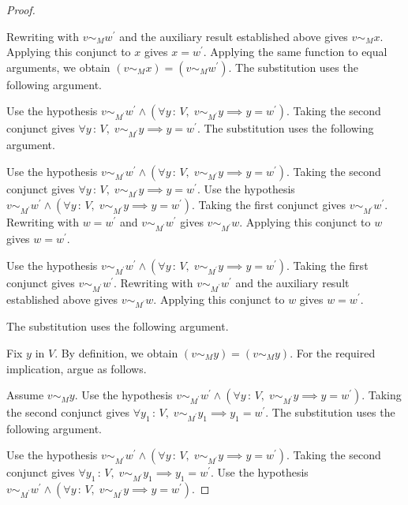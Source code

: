\documentclass{article}
\theoremstyle{paperresult}
\newenvironment{proofstep}{\par\smallskip\ifdim\leftskip<3em\relax\advance\leftskip by 1em\relax\fi\noindent\ignorespaces}{\par\smallskip}
\begin{document}
\begin{proof}
\begin{proofstep}
\begin{proofstep}
\begin{proofstep}
\begin{proofstep}
\begin{proofstep}
Rewriting with \(v \sim_{M} w^{'}\) and the auxiliary result established above gives \(v \sim_{M} x\).
Applying this conjunct to \(x\) gives \(x = w^{'}\).
Applying the same function to equal arguments, we obtain \(\left(v \sim_{M} x\right) = \left(v \sim_{M} w^{'}\right)\).
The substitution uses the following argument.
\begin{proofstep}
Use the hypothesis \(v \sim_{M^{'}} w^{'} \land \left(\forall y\, :\, V,\; v \sim_{M^{'}} y \implies y = w^{'}\right)\).
Taking the second conjunct gives \(\forall y\, :\, V,\; v \sim_{M^{'}} y \implies y = w^{'}\).
The substitution uses the following argument.
\begin{proofstep}
Use the hypothesis \(v \sim_{M^{'}} w^{'} \land \left(\forall y\, :\, V,\; v \sim_{M^{'}} y \implies y = w^{'}\right)\).
Taking the second conjunct gives \(\forall y\, :\, V,\; v \sim_{M^{'}} y \implies y = w^{'}\).
Use the hypothesis \(v \sim_{M^{'}} w^{'} \land \left(\forall y\, :\, V,\; v \sim_{M^{'}} y \implies y = w^{'}\right)\).
Taking the first conjunct gives \(v \sim_{M^{'}} w^{'}\).
Rewriting with \(w = w^{'}\) and \(v \sim_{M^{'}} w^{'}\) gives \(v \sim_{M^{'}} w\).
Applying this conjunct to \(w\) gives \(w = w^{'}\).
\end{proofstep}
Use the hypothesis \(v \sim_{M^{'}} w^{'} \land \left(\forall y\, :\, V,\; v \sim_{M^{'}} y \implies y = w^{'}\right)\).
Taking the first conjunct gives \(v \sim_{M^{'}} w^{'}\).
Rewriting with \(v \sim_{M^{'}} w^{'}\) and the auxiliary result established above gives \(v \sim_{M^{'}} w\).
Applying this conjunct to \(w\) gives \(w = w^{'}\).
\end{proofstep}
The substitution uses the following argument.
\begin{proofstep}
Fix \(y\) in \(V\).
By definition, we obtain \(\left(v \sim_{M} y\right) = \left(v \sim_{M} y\right)\).
For the required implication, argue as follows.
\begin{proofstep}
Assume \(v \sim_{M} y\).
Use the hypothesis \(v \sim_{M^{'}} w^{'} \land \left(\forall y\, :\, V,\; v \sim_{M^{'}} y \implies y = w^{'}\right)\).
Taking the second conjunct gives \(\forall y_{1}\, :\, V,\; v \sim_{M^{'}} y_{1} \implies y_{1} = w^{'}\).
The substitution uses the following argument.
\begin{proofstep}
Use the hypothesis \(v \sim_{M^{'}} w^{'} \land \left(\forall y\, :\, V,\; v \sim_{M^{'}} y \implies y = w^{'}\right)\).
Taking the second conjunct gives \(\forall y_{1}\, :\, V,\; v \sim_{M^{'}} y_{1} \implies y_{1} = w^{'}\).
Use the hypothesis \(v \sim_{M^{'}} w^{'} \land \left(\forall y\, :\, V,\; v \sim_{M^{'}} y \implies y = w^{'}\right)\).

\end{proofstep}
\end{proofstep}
\end{proofstep}
\end{proofstep}
\end{proofstep}
\end{proofstep}
\end{proofstep}
\end{proofstep}
\end{proof}
\end{document}
